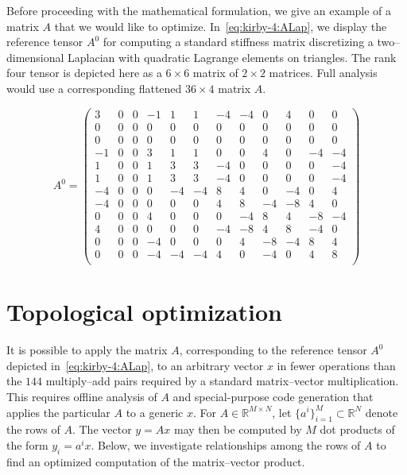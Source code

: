 Before proceeding with the mathematical formulation, we give an example of
a matrix $ A $ that we would like to optimize. In~\eqref{eq:kirby-4:ALap},
we display the reference tensor $A^0$ for computing a standard stiffness
matrix discretizing a two--dimensional Laplacian with quadratic Lagrange
elements on triangles. The rank four tensor is depicted here as a $6
\times 6$ matrix of $2 \times 2$ matrices.  Full analysis would use a
corresponding flattened $36 \times 4$ matrix $A$.

\begin{equation} \label{eq:kirby-4:ALap}
A^0 =
\left(
\begin{array}{cc|cc|cc|cc|cc|cc}
3 & 0 & 0 & -1 & 1 & 1 & -4 & -4 & 0 & 4 & 0 & 0 \\
0 & 0 & 0 & 0 & 0 & 0 & 0 & 0 & 0 & 0 & 0 & 0 \\ \hline
0 & 0 & 0 & 0 & 0 & 0 & 0 & 0 & 0 & 0 & 0 & 0 \\
-1 & 0 & 0 & 3 & 1 & 1 & 0 & 0 & 4 & 0 & -4 & -4 \\ \hline
1 & 0 & 0 & 1 & 3 & 3 & -4 & 0 & 0 & 0 & 0 & -4 \\
1 & 0 & 0 & 1 & 3 & 3 & -4 & 0 & 0 & 0 & 0 & -4 \\ \hline
-4 & 0 & 0 & 0 & -4 & -4 & 8 & 4 & 0 & -4 & 0 & 4 \\
-4 & 0 & 0 & 0 & 0 & 0 & 4 & 8 & -4 & -8 & 4 & 0 \\ \hline
0 & 0 & 0 & 4 & 0 & 0 & 0 & -4 & 8 & 4 & -8 & -4 \\
4 & 0 & 0 & 0 & 0 & 0 & -4 & -8 & 4 & 8 & -4 & 0 \\ \hline
0 & 0 & 0 & -4 & 0 & 0 & 0 & 4 & -8 & -4 & 8 & 4 \\
0 & 0 & 0 & -4 & -4 & -4 & 4 & 0 & -4 & 0 & 4 & 8 \\
\end{array}
\right)
\end{equation}

\section{Topological optimization}

It is possible to apply the matrix $A$, corresponding to the reference
tensor $A^0$ depicted in~\eqref{eq:kirby-4:ALap}, to an arbitrary
vector $x$ in fewer operations than the $144$ multiply--add pairs required
by a standard matrix--vector multiplication. This requires
offline analysis of $A$ and special-purpose code generation that
applies the particular $A$ to a generic $x$. For $ A \in
\mathbb{R}^{M\times N} $, let $\{ a^i \}_{i=1}^M \subset \mathbb{R}^N$
denote the rows of $ A $. The vector $ y = Ax $ may then be computed
by $ M $ dot products of the form $ y_i = a^i x $. Below, we
investigate relationships among the rows of $ A $ to find an optimized
computation of the matrix--vector product.

